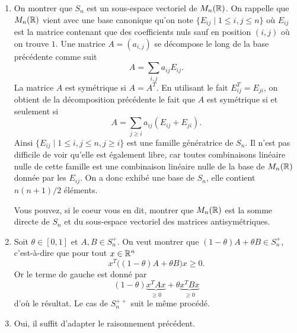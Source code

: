 \documentclass[11pt, a4paper]{article}
\begin{document}
\begin{solution}
  \begin{enumerate}
  \item On montrer que $S_n$ est un sous-espace vectoriel de
    $M_n(\mathbb{R})$. On rappelle que $M_n(\mathbb{R})$ vient avec une base canonique
    qu'on note $\{E_{ij}\mid 1 \leq i, j \leq n\}$ où $E_{ij}$ est la
    matrice contenant que des coefficients nuls sauf en position
    $(i,j)$ où on trouve $1$. Une matrice $A = (a_{i, j})$ se
    décompose le long de la base précédente comme suit
    \[
    A = \sum_{i, j} a_{ij}E_{ij}.
    \]
    La matrice $A$ est symétrique si $A = A^T$. En utilisant le fait
    $E_{ij}^T = E_{ji}$, on obtient de la décomposition précédente le
    fait que $A$ est symétrique si et seulement si
    \[
    A = \sum_{j \geq i} a_{ij}\left(E_{ij} + E_{ji}\right).
    \]
    Ainsi $\{E_{ij}\mid 1 \leq i, j \leq n, j \geq i\}$ est une
    famille génératrice de $S_n$. Il n'est pas difficile de voir
    qu'elle est également libre, car toutes combinaisons linéaire
    nulle de cette famille est une combinaison linéaire nulle de la
    base de $M_n(\mathbb{R})$ donnée par les $E_{ij}$. On a donc exhibé une
    base de $S_n$, elle contient $n(n+1)/2$ éléments.

    Vous pouvez, si le coeur vous en dit, montrer que $M_n(\mathbb{R})$ est la
    somme directe de $S_n$ et du sous-espace vectoriel des matrices
    antisymétriques.
  \item Soit $\theta \in [0, 1]$ et $A, B \in S_n^+$. On veut montrer
    que $(1-\theta)A + \theta B \in S_n^+$, c'est-à-dire que pour tout
    $x \in \mathbb{R}^n$
    \[
    x^T\big((1-\theta)A + \theta B\big)x \geq 0.
    \]
    Or le terme de gauche est donné par
    \[
    (1-\theta)\underbrace{x^TAx}_{\geq 0} + \theta\underbrace{x^TBx}_{\geq 0}
    \]
    d'où le résultat. Le cas de $S_n^{++}$ suit le même procédé.
  \item Oui, il suffit d'adapter le raisonnement précédent.
  \end{enumerate}
\end{solution}
\end{document}
